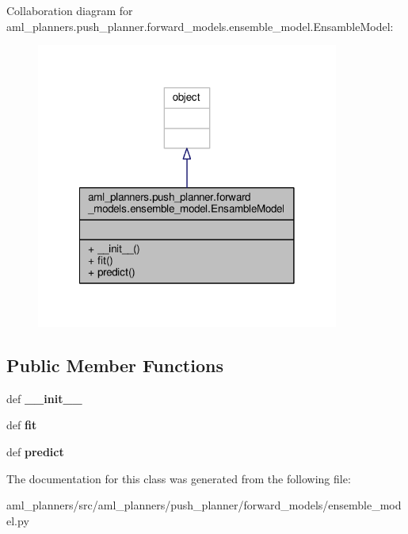 Collaboration diagram for aml\-\_\-planners.\-push\-\_\-planner.\-forward\-\_\-models.\-ensemble\-\_\-model.\-Ensamble\-Model\-:\nopagebreak
\begin{figure}[H]
\begin{center}
\leavevmode
\includegraphics[width=282pt]{classaml__planners_1_1push__planner_1_1forward__models_1_1ensemble__model_1_1_ensamble_model__coll__graph}
\end{center}
\end{figure}
\subsection*{Public Member Functions}
\begin{DoxyCompactItemize}
\item 
\hypertarget{classaml__planners_1_1push__planner_1_1forward__models_1_1ensemble__model_1_1_ensamble_model_ab482b605fc4cf21a7936722a2d1aec2d}{def {\bfseries \-\_\-\-\_\-init\-\_\-\-\_\-}}\label{classaml__planners_1_1push__planner_1_1forward__models_1_1ensemble__model_1_1_ensamble_model_ab482b605fc4cf21a7936722a2d1aec2d}

\item 
\hypertarget{classaml__planners_1_1push__planner_1_1forward__models_1_1ensemble__model_1_1_ensamble_model_a8fa811fef865b143d6bb09010f37ed54}{def {\bfseries fit}}\label{classaml__planners_1_1push__planner_1_1forward__models_1_1ensemble__model_1_1_ensamble_model_a8fa811fef865b143d6bb09010f37ed54}

\item 
\hypertarget{classaml__planners_1_1push__planner_1_1forward__models_1_1ensemble__model_1_1_ensamble_model_aaa51602a9010d5a6616f514e6b66007b}{def {\bfseries predict}}\label{classaml__planners_1_1push__planner_1_1forward__models_1_1ensemble__model_1_1_ensamble_model_aaa51602a9010d5a6616f514e6b66007b}

\end{DoxyCompactItemize}


The documentation for this class was generated from the following file\-:\begin{DoxyCompactItemize}
\item 
aml\-\_\-planners/src/aml\-\_\-planners/push\-\_\-planner/forward\-\_\-models/ensemble\-\_\-model.\-py\end{DoxyCompactItemize}
